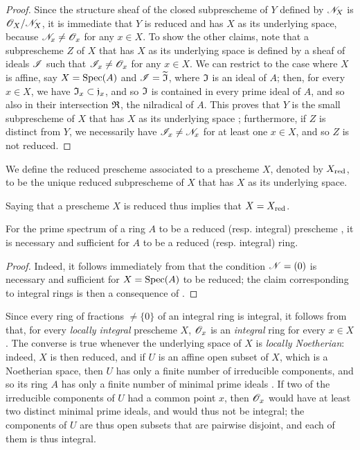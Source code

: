 \begin{proof}
\label{proof-1.5.1.2}
Since the structure sheaf of the closed subprescheme of $Y$ defined by $\mathscr{N}_X$ is $\mathscr{O}_X/\mathscr{N}_X$, it is immediate that $Y$ is reduced and has $X$ as its underlying space, because $\mathscr{N}_x\neq\mathscr{O}_x$ for any $x\in X$.
To show the other claims, note that a subprescheme $Z$ of $X$ that has $X$ as its underlying space is defined by a sheaf of ideals $\mathscr{I}$  such that $\mathscr{I}_x\neq\mathscr{O}_x$ for any $x\in X$.
We can restrict to the case where $X$ is affine, say $X={\mathop{\mathrm{Spec}}\nolimits}(A)$ and $\mathscr{I}={\widetilde{\mathfrak{I}}}$, where $\mathfrak{I}$ is an ideal of $A$;
then, for every $x\in X$, we have $\mathfrak{I}_x\subset\mathfrak{j}_x$, and so $\mathfrak{I}$ is contained in every prime ideal of $A$, and so also in their intersection $\mathfrak{R}$, the nilradical of $A$.
This proves that $Y$ is the small subprescheme of $X$ that has $X$ as its underlying space ;
furthermore, if $Z$ is distinct from $Y$, we necessarily have $\mathscr{I}_x\neq\mathscr{N}_x$ for at least one $x\in X$, and so  $Z$ is not reduced.
\end{proof}

\begin{defn}[5.1.3]
\label{1.5.1.3}
We define the reduced prescheme associated to a prescheme $X$, denoted by $X_{\mathrm{red}}$, to be the unique reduced subprescheme of $X$ that has $X$ as its underlying space.
\end{defn}

Saying that a prescheme $X$ is reduced thus implies that $X=X_{\mathrm{red}}$.

\begin{prop}[5.1.4]
\label{1.5.1.4}
For the prime spectrum of a ring $A$ to be a reduced (resp. integral) prescheme , it is necessary and sufficient for $A$ to be a reduced (resp. integral) ring.
\end{prop}

\begin{proof}
\label{proof-1.5.1.4}
Indeed, it follows immediately from  that the condition $\mathscr{N}=(0)$ is necessary and sufficient for $X={\mathop{\mathrm{Spec}}\nolimits}(A)$ to be reduced;
the claim corresponding to integral rings is then a consequence of .
\end{proof}

Since every ring of fractions $\neq\{0\}$ of an integral ring is integral, it follows from  that, for every \emph{locally integral} prescheme $X$, $\mathscr{O}_x$ is an \emph{integral} ring for every $x\in X$.
The converse is true whenever the underlying space of $X$ is \emph{locally Noetherian}:
indeed, $X$ is then reduced, and if $U$ is an affine open subset of $X$, which is a Noetherian space, then $U$ has only a finite number of irreducible components, and so its ring $A$ has only a finite number of minimal prime ideals .
If two of the irreducible components of $U$ had a common point $x$, then $\mathscr{O}_x$ would have at least two distinct minimal prime ideals, and would thus not be integral;
the components of $U$ are thus open subsets that are pairwise disjoint, and each of them is thus integral.

